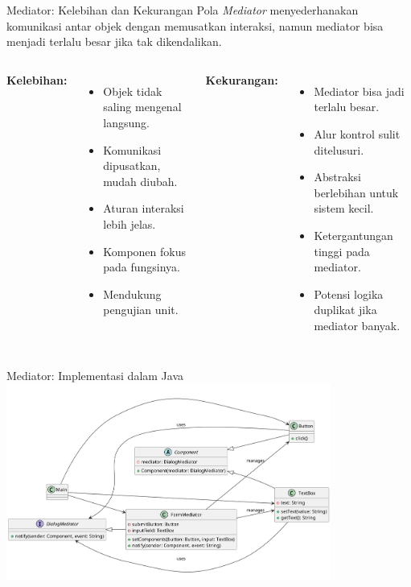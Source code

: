 \documentclass[aspectratio=169, table]{beamer}
\begin{document}
\begin{frame}{Mediator: Kelebihan dan Kekurangan}
	\vspace{4pt}
	Pola \textit{Mediator} menyederhanakan komunikasi antar objek dengan memusatkan interaksi, namun mediator bisa menjadi terlalu besar jika tak dikendalikan.
	
	\vspace{4pt}
	\begin{columns}[T]
		\textbf{Kelebihan:}
		\begin{itemize}
			\item Objek tidak saling mengenal langsung.
			\item Komunikasi dipusatkan, mudah diubah.
			\item Aturan interaksi lebih jelas.
			\item Komponen fokus pada fungsinya.
			\item Mendukung pengujian unit.
		\end{itemize}
		
		\textbf{Kekurangan:}
		\begin{itemize}
			\item Mediator bisa jadi terlalu besar.
			\item Alur kontrol sulit ditelusuri.
			\item Abstraksi berlebihan untuk sistem kecil.
			\item Ketergantungan tinggi pada mediator.
			\item Potensi logika duplikat jika mediator banyak.
		\end{itemize}
	\end{columns}
\end{frame}




\begin{frame}{Mediator: Implementasi dalam Java}
\vspace{10pt}
\centering
\includegraphics[width=0.8\textwidth]{../../figures/out/mediator.png}
\end{frame}
\end{document}
